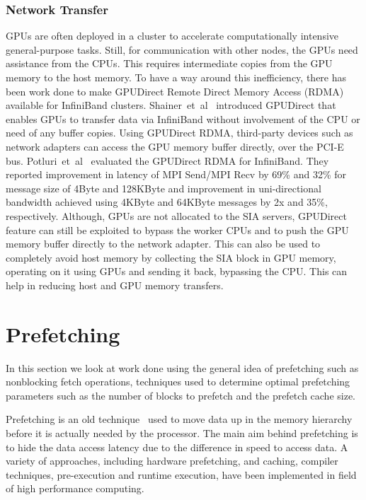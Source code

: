 \subsubsection{Network Transfer}
GPUs are often deployed in a cluster to accelerate computationally intensive
general-purpose tasks. Still, for communication with other nodes, the GPUs need assistance from the CPUs.
This requires intermediate copies from the GPU memory to the host memory. To have
a way around this inefficiency, there has been work done to make GPUDirect Remote
Direct Memory Access (RDMA) available for InfiniBand clusters. Shainer~et~al~\cite{Shainer2011} introduced
GPUDirect that enables GPUs to transfer data via InfiniBand without involvement
of the CPU or need of any buffer copies. Using GPUDirect RDMA, third-party devices such as
network adapters can access the GPU memory buffer directly, over the PCI-E bus.
Potluri~et~al~\cite{Potluri:2013:EIM:2570457.2571010} evaluated the GPUDirect RDMA for InfiniBand. They reported
improvement in latency of MPI Send/MPI Recv by 69\% and 32\% for message size of
4Byte and 128KByte and improvement in uni-directional bandwidth achieved using
4KByte and 64KByte messages by 2x and 35\%, respectively.
Although, GPUs are not allocated to the SIA servers, GPUDirect feature can still
be exploited to bypass the worker CPUs and to push the GPU memory buffer directly to the network
adapter. This can also be used to completely avoid host memory by collecting the
SIA block in GPU memory, operating on it using GPUs and sending it back, bypassing
the CPU. This can help in reducing host and GPU memory transfers.

\section{Prefetching}
In this section we look at work done using the general idea of prefetching such as
nonblocking fetch operations, techniques used to determine optimal prefetching
parameters such as the number of blocks to prefetch and the prefetch cache size.

Prefetching is an old technique~\cite{anacker68, Smith1982, Vanderwiel2000}
used to move data up in the memory hierarchy before it is actually needed by the processor.
The main aim behind prefetching is to hide the data access latency due to the difference in speed to access
data. A variety of approaches, including hardware prefetching, and caching, compiler
techniques, pre-execution and runtime execution, have been implemented in field of
high performance computing.

